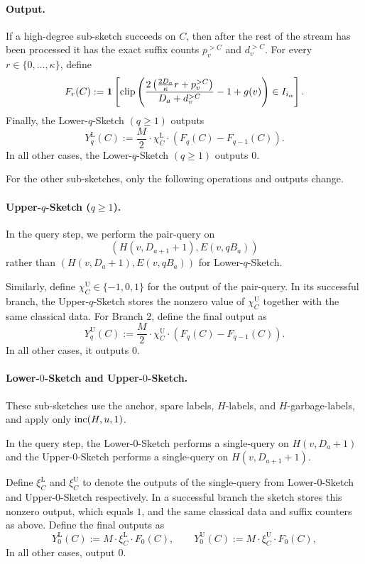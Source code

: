 \paragraph{Output.} If a high-degree sub-sketch succeeds on $C$, then after the rest of the stream has been processed it has the exact suffix counts $p_v^{>C}$ and $d_v^{>C}$. For every $r\in\{0,\ldots,\kappa\}$, define
\[
F_r(C)
:=
\mathbf 1 \left[
\operatorname{clip}
\left(
\frac{2\left(\frac{2D_a}{\kappa}r+p_v^{>C}\right)}
     {D_a+d_v^{>C}}
-1+g(v)
\right)
\in I_{i_\alpha}
\right].
\]
Finally,  the Lower-$q$-Sketch $(q\ge 1)$ outputs 
\[
  Y_q^{\mathrm L}(C):=\frac M2\cdot \chi_{C}^{\mathrm L}\cdot (F_q(C)-F_{q-1}(C)). 
\]
In all other cases,  the Lower-$q$-Sketch $(q\ge 1)$ outputs $0$.

\medskip

For the other sub-sketches, only the following operations and outputs change.

\paragraph{Upper-$q$-Sketch ($q\ge 1$).} In the query step, we perform the pair-query on \[
(H(v,D_{a+1}+1), 
E(v,qB_a ))
\]
rather than $(H(v,D_{a}+1), E(v,qB_a ))$ for Lower-$q$-Sketch.

Similarly, define $\chi^{\mathrm U}_{C}\in \{-1,0,1\}$ for the output of the pair-query. In its successful branch, the Upper-$q$-Sketch stores the nonzero value of $\chi_C^{\mathrm U}$ together with the same classical data. For Branch $2$, define the final output as
\[
  Y_q^{\mathrm U}(C):=\frac M2\cdot \chi_{C}^{\mathrm U}\cdot (F_q(C)-F_{q-1}(C)).
\]
In all other cases, it outputs  $0$.

\paragraph{Lower-$0$-Sketch and Upper-$0$-Sketch.} These sub-sketches use the anchor, spare labels, $H$-labels, and $H$-garbage-labels, and apply only $\mathrm{inc}(H,u,1)$.

In the query step, the Lower-$0$-Sketch performs a single-query on $H(v,D_a+1)$ and the Upper-$0$-Sketch performs a single-query on $
H(v,D_{a+1}+1)$.

Define $\xi_{C}^{\mathrm L}$ and $\xi_{C}^{\mathrm U}$ to denote the outputs of the single-query from Lower-$0$-Sketch and  Upper-$0$-Sketch  respectively. In a successful branch the sketch stores this nonzero output, which equals $1$, and the same classical data and suffix counters as above. Define the final outputs as \[
  Y_0^{\mathrm L}(C):=M\cdot \xi_{C}^{\mathrm L}\cdot F_0(C),
  \qquad
  Y_0^{\mathrm U}(C):=M\cdot \xi_{C}^{\mathrm U}\cdot F_0(C),
\]
In all other cases, output $0$.







